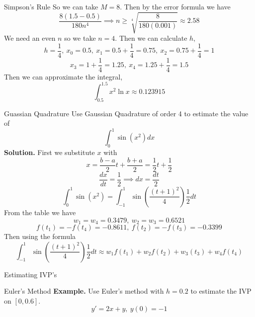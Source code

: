\documentclass{article}
\begin{document}
\begin{multicols*}{3}
\begin{blackbox}{Simpson's Rule}
            So we can take $M = 8$. Then by the error formula we have\\[-2ex]
            {\footnotesize
            \[\frac{8(1.5-0.5)}{180n^4} \implies n \geq \sqrt[4]{\frac{8}{180(0.001)}} \approx 2.58\]
            }
            We need an even $n$ so we take $n=4$. Then we can calculate $h$,
            {\footnotesize
            \[h = \frac{1}{4}, \ x_0 = 0.5, \ x_1 = 0.5 + \frac{1}{4} = 0.75, \ x_2 = 0.75 + \frac{1}{4} = 1\]
            \[x_3 = 1 + \frac{1}{4} = 1.25, \ x_4 = 1.25 + \frac{1}{4} = 1.5\]
            }
            Then we can approximate the integral,
            \[\int_{0.5}^{1.5} x^2\ln x \approx 0.123915\]
    \end{blackbox}
    \begin{blackbox}{Guassian Quadrature}
        Use Gaussian Quadrature of order 4 to estimate the value of \\[-2ex]
        \[\int_{0}^1\sin(x^2)dx\]
        \textbf{Solution.} First we substitute $x$ with \\[-1ex]
        \[x = \frac{b-a}{2}t + \frac{b+a}{2} = \frac{1}{2}t +\frac{1}{2}\]
        \vspace{-2ex}
        \[\frac{dx}{dt} = \frac{1}{2} \implies dx = \frac{dt}{2}\]
        \[\int_0^1 \sin(x^2) = \int_{-1}^1 \sin \left(\frac{(t+1)^2}{4}\right) \frac{1}{2}dt\]
        From the table we have \\[-2ex]
        \[w_1 = w_4 = 0.3479, \ w_2 = w_3 = 0.6521\]
        \[f(t_1) = -f(t_4) = - 0.8611, \  f(t_2) = - f(t_3) = -0.3399\]
        Then using the formula
        {\footnotesize
        \[\int_{-1}^1 \sin \left(\frac{(t+1)^2}{4}\right) \frac{1}{2}dt \approx w_1f(t_1) + w_2f(t_2) + w_3(t_3) + w_4f(t_4)\]
        }
    \end{blackbox}
    \begin{blackbox}{Estimating IVP's}
        \begin{bluebox}{Euler's Method}
            \textbf{Example.} Use Euler's method with $h=0.2$ to estimate the IVP on $[0,0.6]$.\\[-2ex]
            \[y' = 2x + y, \ y(0) = -1\]


\end{bluebox}
\end{blackbox}
\end{multicols*}
\end{document}
